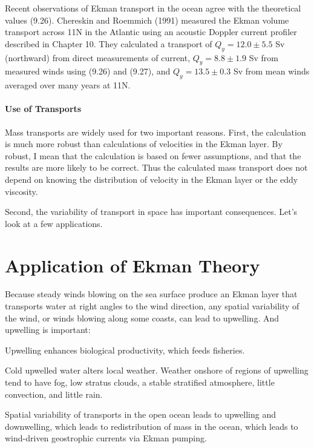 Recent observations of Ekman transport in the ocean agree with the theoretical values
(9.26). Chereskin and Roemmich (1991) measured the Ekman volume
transport across 11\degrees N in the Atlantic using an acoustic
Doppler current profiler described in Chapter 10. They calculated a
transport of $Q_y = 12.0 \pm 5.5$ Sv (northward) from direct
measurements of current, $Q_y = 8.8 \pm 1.9$ Sv from measured winds
using (9.26) and (9.27), and $Q_y = 13.5 \pm 0.3$ Sv from mean winds
averaged over many years at 11\degrees N.

\paragraph{Use of Transports}
Mass transports are
widely used for two important reasons. First, the calculation is much
more robust than calculations of velocities in the Ekman layer. By
robust, I mean that the calculation is based on fewer assumptions, and
that the results are more likely to be correct. Thus the calculated
mass transport does not depend on knowing the distribution of velocity
in the Ekman layer or the eddy viscosity.

Second, the variability of transport in space has important
consequences. Let's look at a few applications.

\section{Application of Ekman Theory}

Because steady winds blowing on the sea surface produce an Ekman layer
that transports water at right
angles to the wind direction, any spatial variability of the wind, or
winds blowing along some coasts, can lead to
upwelling. And
upwelling is important:
\begin{enumerate}
\vitem Upwelling enhances biological productivity, which feeds
fisheries.

\vitem Cold upwelled water alters local weather. Weather onshore of
regions of upwelling tend to
have fog, low stratus clouds, a stable stratified atmosphere, little
convection, and little rain.

\vitem Spatial variability of transports in the open ocean leads to
upwelling and downwelling, which
leads to redistribution of mass in the ocean, which leads to
wind-driven geostrophic currents via Ekman pumping.
\end{enumerate}

